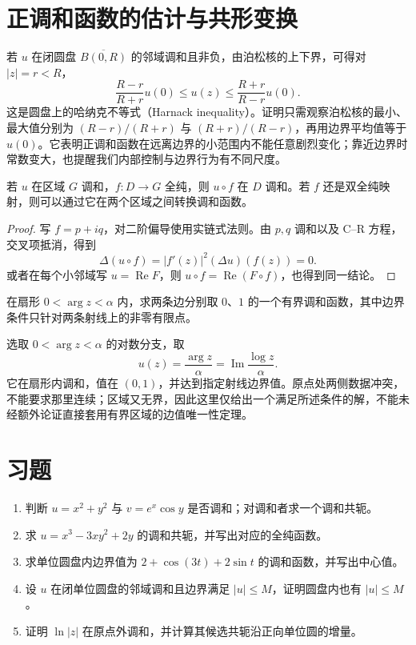 \documentclass[UTF8,12pt,a4paper,fontset=fandol]{ctexbook}
\begin{document}
\section{正调和函数的估计与共形变换}

若 $u$ 在闭圆盘 $\overline{B(0,R)}$ 的邻域调和且非负，由泊松核的上下界，可得对 $|z|=r<R$，
\begin{equation}
 \frac{R-r}{R+r}u(0)\le u(z)\le\frac{R+r}{R-r}u(0).
 \label{eq:cv-harnack}
\end{equation}
这是圆盘上的哈纳克不等式（Harnack inequality）。证明只需观察泊松核的最小、最大值分别为 $(R-r)/(R+r)$ 与 $(R+r)/(R-r)$，再用边界平均值等于 $u(0)$。它表明正调和函数在远离边界的小范围内不能任意剧烈变化；靠近边界时常数变大，也提醒我们内部控制与边界行为有不同尺度。

\begin{proposition}[调和性的共形不变性]
若 $u$ 在区域 $G$ 调和，$f:D\to G$ 全纯，则 $u\circ f$ 在 $D$ 调和。若 $f$ 还是双全纯映射，则可以通过它在两个区域之间转换调和函数。
\end{proposition}
\begin{proof}
写 $f=p+iq$，对二阶偏导使用实链式法则。由 $p,q$ 调和以及 C--R 方程，交叉项抵消，得到
\[
 \Delta(u\circ f)=|f'(z)|^2(\Delta u)(f(z))=0.
\]
或者在每个小邻域写 $u=\operatorname{Re}F$，则 $u\circ f=\operatorname{Re}(F\circ f)$，也得到同一结论。
\end{proof}

\begin{example}[扇形上的边界值]
在扇形 $0<\arg z<\alpha$ 内，求两条边分别取 $0$、$1$ 的一个有界调和函数，其中边界条件只针对两条射线上的非零有限点。
\end{example}
\begin{solve}
选取 $0<\arg z<\alpha$ 的对数分支，取
\[
 u(z)=\frac{\arg z}{\alpha}=\operatorname{Im}\frac{\log z}{\alpha}.
\]
它在扇形内调和，值在 $(0,1)$，并达到指定射线边界值。原点处两侧数据冲突，不能要求那里连续；区域又无界，因此这里仅给出一个满足所述条件的解，不能未经额外论证直接套用有界区域的边值唯一性定理。
\end{solve}

\section{习题}
\label{sec:cv-harmonic-ex}
\begin{enumerate}
 \item 判断 $u=x^2+y^2$ 与 $v=e^x\cos y$ 是否调和；对调和者求一个调和共轭。
 \item 求 $u=x^3-3xy^2+2y$ 的调和共轭，并写出对应的全纯函数。
 \item 求单位圆盘内边界值为 $2+\cos(3t)+2\sin t$ 的调和函数，并写出中心值。
 \item 设 $u$ 在闭单位圆盘的邻域调和且边界满足 $|u|\le M$，证明圆盘内也有 $|u|\le M$。
 \item 证明 $\ln|z|$ 在原点外调和，并计算其候选共轭沿正向单位圆的增量。
\end{enumerate}
\end{document}

